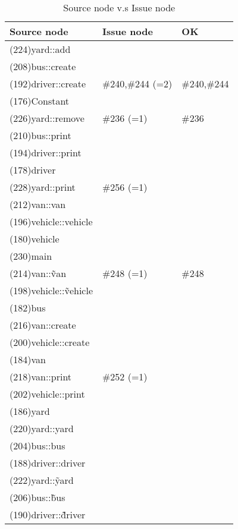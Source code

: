 \begin{table}[hb]
\begin{center}
\begin{tabular}{|l|l|l|}
\hline
Source node & Issue node & OK \\
\hline
(224)yard::add & & \\
(208)bus::create & & \\
(192)driver::create & \#240,\#244 (=2) & \#240,\#244 \\
(176)Constant & & \\
(226)yard::remove & \#236 (=1) & \#236\\
(210)bus::print & & \\
(194)driver::print & & \\
(178)driver & & \\
(228)yard::print & \#256 (=1) &  \\
(212)van::van & & \\
(196)vehicle::vehicle & & \\
(180)vehicle & & \\
(230)main & & \\
(214)van::\~van & \#248 (=1) & \#248\\
(198)vehicle::\~vehicle & & \\
(182)bus & & \\
(216)van::create & & \\
(200)vehicle::create & & \\
(184)van & & \\
(218)van::print & \#252 (=1)& \\
(202)vehicle::print & & \\
(186)yard & & \\
(220)yard::yard & & \\
(204)bus::bus & & \\
(188)driver::driver & & \\
(222)yard::\~yard & & \\
(206)bus::\~bus & & \\
(190)driver::\~driver & & \\
\hline
\end{tabular}
\caption{Source node v.s Issue node}
\end{center}
\end{table}

